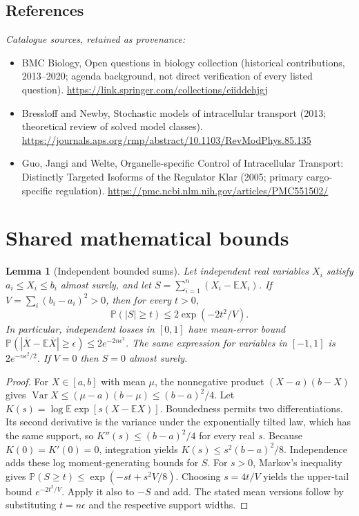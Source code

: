 \documentclass[11pt]{article}
\newcommand{\E}{\mathbb E}
\newcommand{\Prob}{\mathbb P}
\DeclareMathOperator{\Var}{Var}
\providecommand{\E}{\mathbb E}
\providecommand{\Prob}{\mathbb P}
\providecommand{\Var}{\operatorname{Var}}
\newtheorem{sharedlemma}{Lemma}[section]
\begin{document}
\subsection{References}
\noindent\emph{Catalogue sources, retained as provenance:}
\begin{itemize}
\item BMC Biology, Open questions in biology collection (historical contributions, 2013--2020; agenda background, not direct verification of every listed question). \url{https://link.springer.com/collections/eiiddehjgj}
\item Bressloff and Newby, Stochastic models of intracellular transport (2013; theoretical review of solved model classes). \url{https://journals.aps.org/rmp/abstract/10.1103/RevModPhys.85.135}
\item Guo, Jangi and Welte, Organelle-specific Control of Intracellular Transport: Distinctly Targeted Isoforms of the Regulator Klar (2005; primary cargo-specific regulation). \url{https://pmc.ncbi.nlm.nih.gov/articles/PMC551502/}
\end{itemize}
\clearpage


\appendix
\section{Shared mathematical bounds}\label{app:bounds}
\begin{sharedlemma}[Independent bounded sums]\label{lem:bounded}
Let independent real variables $X_i$ satisfy $a_i\leq X_i\leq b_i$ almost surely,
and let $S=\sum_{i=1}^n(X_i-\E X_i)$. If
$V=\sum_i(b_i-a_i)^2>0$, then for every $t>0$,
\[
 \Prob(|S|\geq t)\leq 2\exp(-2t^2/V).
\]
In particular, independent losses in $[0,1]$ have mean-error bound
$\Prob(|\overline X-\E\overline X|\geq\epsilon)
\leq2e^{-2n\epsilon^2}$. The same expression for variables in $[-1,1]$
is $2e^{-n\epsilon^2/2}$. If $V=0$ then $S=0$ almost surely.
\end{sharedlemma}
\begin{proof}
For $X\in[a,b]$ with mean $\mu$, the nonnegative product
$(X-a)(b-X)$ gives
$\Var X\leq(\mu-a)(b-\mu)\leq(b-a)^2/4$.
Let $K(s)=\log\E\exp[s(X-\E X)]$.
Boundedness permits two differentiations. Its second derivative is the variance
under the exponentially tilted law, which has the same support, so
$K''(s)\leq(b-a)^2/4$ for every real $s$.
Because $K(0)=K'(0)=0$, integration yields
$K(s)\leq s^2(b-a)^2/8$.
Independence adds these log moment-generating bounds for $S$.
For $s>0$, Markov's inequality gives
$\Prob(S\geq t)\leq\exp(-st+s^2V/8)$.
Choosing $s=4t/V$ yields the upper-tail bound $e^{-2t^2/V}$.
Apply it also to $-S$ and add. The stated mean versions follow by substituting
$t=n\epsilon$ and the respective support widths.
\end{proof}
\end{document}
